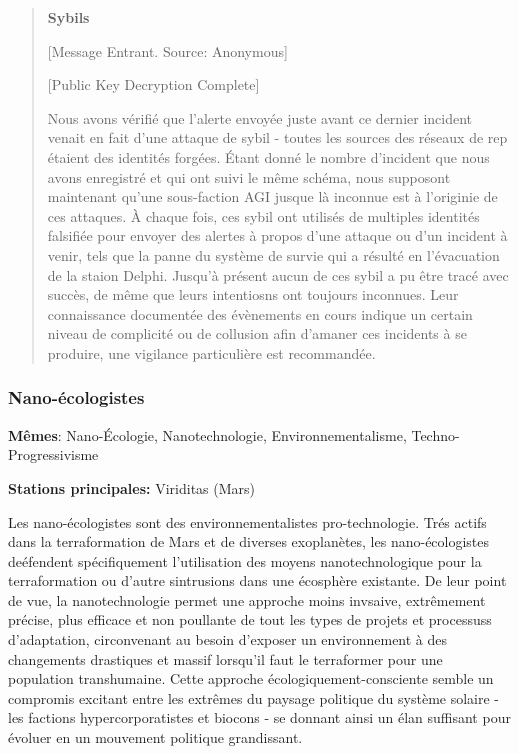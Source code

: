 \begin{quotation} \textbf{Sybils} 

[Message Entrant. Source: Anonymous] 

[Public Key Decryption Complete] 

Nous avons vérifié que l'alerte envoyée juste avant ce dernier incident venait en fait d'une attaque de sybil - toutes les sources des réseaux de rep étaient des identités forgées. Étant donné le nombre d'incident que nous avons enregistré et qui ont suivi le même schéma, nous supposont maintenant qu'une sous-faction AGI jusque là inconnue est à l'originie de ces attaques. À chaque fois, ces sybil ont utilisés de multiples identités falsifiée pour envoyer des alertes à propos d'une attaque ou d'un incident à venir, tels que la panne du système de survie qui a résulté en l'évacuation de la staion Delphi. Jusqu'à présent aucun de ces sybil a pu être tracé avec succès, de même que leurs intentiosns ont toujours inconnues. Leur connaissance documentée des évènements en cours indique un certain niveau de complicité ou de collusion afin d'amaner ces incidents à se produire, une vigilance particulière est recommandée. \end{quotation} 

\subsubsection{Nano-écologistes} \label{sec:nano-ecologists} 

\textbf{Mêmes}: Nano-Écologie, Nanotechnologie, Environnementalisme, Techno-Progressivisme 

\textbf{Stations principales:} Viriditas (Mars) 

Les nano-écologistes sont des environnementalistes pro-technologie. Trés actifs dans la terraformation de Mars et de diverses exoplanètes, les nano-écologistes deéfendent spécifiquement l'utilisation des moyens nanotechnologique pour la terraformation ou d'autre sintrusions dans une écosphère existante. De leur point de vue, la nanotechnologie permet une approche moins invsaive, extrêmement précise, plus efficace et non poullante de tout les types de projets et processuss d'adaptation, circonvenant au besoin d'exposer un environnement à des changements drastiques et massif lorsqu'il faut le terraformer pour une population transhumaine. Cette approche écologiquement-consciente semble un compromis excitant entre les extrêmes du paysage politique du système solaire - les factions hypercorporatistes et biocons - se donnant ainsi un élan suffisant pour évoluer en un mouvement politique grandissant. 

